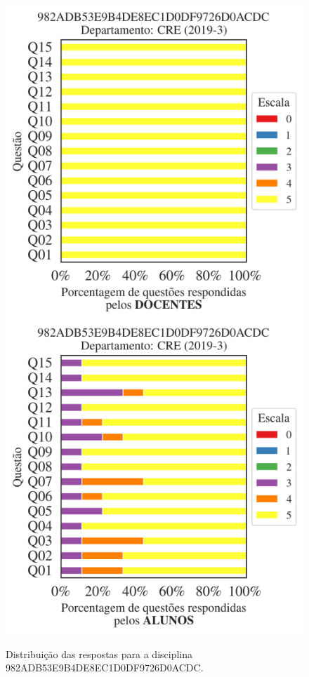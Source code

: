 \documentclass[a4paper,10pt]{article}
\begin{document}
\begin{figure}[h]
\centering
\includegraphics[width=0.485\linewidth]{analise_disciplina_departamento_CRE_982ADB53E9B4DE8EC1D0DF9726D0ACDC_docentes.png}
\includegraphics[width=0.485\linewidth]{analise_disciplina_departamento_CRE_982ADB53E9B4DE8EC1D0DF9726D0ACDC_alunos.png}
\caption{\label{fig:analise_geral_departamento}                Distribuição das respostas para a disciplina 982ADB53E9B4DE8EC1D0DF9726D0ACDC. }
\end{figure}
\end{document}
